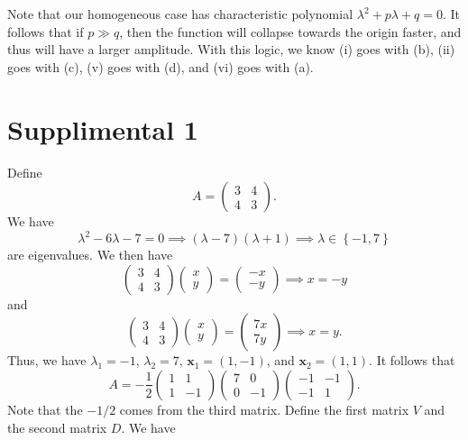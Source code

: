 \documentclass[11pt, letterpaper]{report}
\begin{document}
Note that our homogeneous case has characteristic polynomial $\lambda^2+p\lambda +q=0$. It follows that if $p\gg q$, then the function will collapse towards the origin faster, and thus will have a larger amplitude. With this logic, we know (i) goes with (b), (ii) goes with (c), (v) goes with (d), and (vi) goes with (a).
\section*{Supplimental 1}
Define
\[
	A=\begin{pmatrix}
		3&4\\
		4&3
	\end{pmatrix} 
.\]
We have
\[
	\lambda ^2-6\lambda -7=0\implies \left( \lambda -7 \right) \left( \lambda +1 \right) \implies \lambda \in\left\{ -1,7 \right\} 
\]
are eigenvalues. We then have
\[
	\begin{pmatrix}
		3&4\\
		4&3
	\end{pmatrix} \begin{pmatrix}
		x\\
		y
	\end{pmatrix} =\begin{pmatrix}
		-x\\
		-y
	\end{pmatrix} \implies x=-y
\]
and
\[
	\begin{pmatrix}
		3&4\\
		4&3
	\end{pmatrix} \begin{pmatrix}
		x\\
		y
	\end{pmatrix} =\begin{pmatrix}
		7x\\
		7y
	\end{pmatrix} \implies x=y
.\]
Thus, we have $\lambda_1=-1$, $\lambda_2=7$, $\mathbf{x}_1=(1,-1)$, and $\mathbf{x}_2=(1,1)$. It follows that
\[
	A=-\frac{1}{2}\begin{pmatrix}
		1&1\\
		1&-1
	\end{pmatrix} \begin{pmatrix}
		7&0\\
		0&-1
	\end{pmatrix} \begin{pmatrix}
		-1&-1\\
		-1&1
	\end{pmatrix} 
.\]
Note that the $-1 /2$ comes from the third matrix. Define the first matrix $V$ and the second matrix $D$. We have
\end{document}
